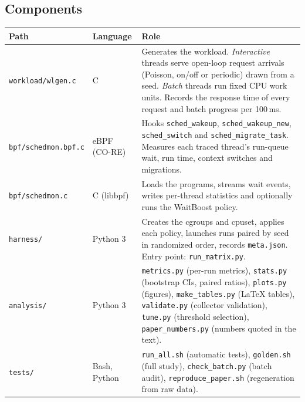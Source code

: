 \documentclass[10.5pt,a4paper]{article}
\newcommand{\f}[1]{\texttt{#1}}
\begin{document}
\subsection{Components}
\begin{tabularx}{\textwidth}{@{}l l L@{}}
\toprule
\textbf{Path} & \textbf{Language} & \textbf{Role} \\
\midrule
\f{workload/wlgen.c} & C & Generates the workload. \emph{Interactive} threads serve open-loop request arrivals (Poisson, on/off or periodic) drawn from a seed. \emph{Batch} threads run fixed CPU work units. Records the response time of every request and batch progress per 100\,ms. \\
\f{bpf/schedmon.bpf.c} & eBPF (CO-RE) & Hooks \f{sched\_wakeup}, \f{sched\_wakeup\_new}, \f{sched\_switch} and \f{sched\_migrate\_task}. Measures each traced thread's run-queue wait, run time, context switches and migrations. \\
\f{bpf/schedmon.c} & C (libbpf) & Loads the programs, streams wait events, writes per-thread statistics and optionally runs the WaitBoost policy. \\
\f{harness/} & Python 3 & Creates the cgroups and cpuset, applies each policy, launches runs paired by seed in randomized order, records \f{meta.json}. Entry point: \f{run\_matrix.py}. \\
\f{analysis/} & Python 3 & \f{metrics.py} (per-run metrics), \f{stats.py} (bootstrap CIs, paired ratios), \f{plots.py} (figures), \f{make\_tables.py} (LaTeX tables), \f{validate.py} (collector validation), \f{tune.py} (threshold selection), \f{paper\_numbers.py} (numbers quoted in the text). \\
\f{tests/} & Bash, Python & \f{run\_all.sh} (automatic tests), \f{golden.sh} (full study), \f{check\_batch.py} (batch audit), \f{reproduce\_paper.sh} (regeneration from raw data). \\
\bottomrule
\end{tabularx}
\end{document}
